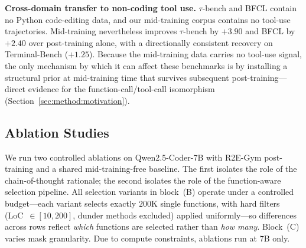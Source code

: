 \textbf{Cross-domain transfer to non-coding tool use.}
$\tau$-bench and BFCL contain no Python code-editing data, and our
mid-training corpus contains no tool-use trajectories. Mid-training
nevertheless improves $\tau$-bench by $+3.90$ and BFCL by $+2.40$ over
post-training alone, with a directionally consistent recovery on
Terminal-Bench ($+1.25$). Because the mid-training data carries no
tool-use signal, the only mechanism by which it can affect these
benchmarks is by installing a structural prior at mid-training time
that survives subsequent post-training---direct evidence for the
function-call/tool-call isomorphism (Section~\ref{sec:method:motivation}).

\vspace{-0.5ex}
\subsection{Ablation Studies}
\label{sec:exp:ablation}

We run two controlled ablations on Qwen2.5-Coder-7B with R2E-Gym
post-training and a shared mid-training-free baseline. The first
isolates the role of the chain-of-thought rationale; the second isolates
the role of the function-aware selection pipeline. All selection
variants in block~(B) operate under a controlled budget---each variant
selects exactly $200$K single functions, with hard filters
(LoC~$\in[10,200]$, dunder methods excluded) applied uniformly---so
differences across rows reflect \emph{which} functions are selected
rather than \emph{how many}. Block~(C) varies mask granularity. Due to
compute constraints, ablations run at 7B only.

